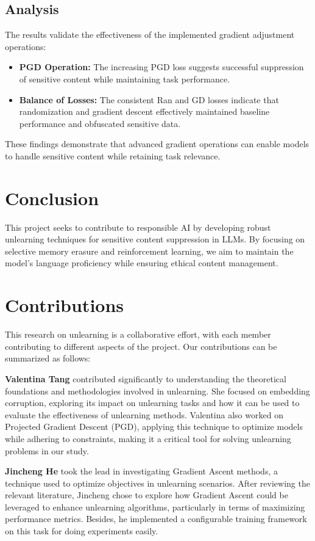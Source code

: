 \documentclass[11pt]{article}
\begin{document}
    \subsection{Analysis}
    The results validate the effectiveness of the implemented gradient adjustment operations:
    \begin{itemize}
        \item \textbf{PGD Operation:} The increasing PGD loss suggests successful suppression of sensitive content while maintaining task performance.
        \item \textbf{Balance of Losses:} The consistent Ran and GD losses indicate that randomization and gradient descent effectively maintained baseline performance and obfuscated sensitive data.
    \end{itemize}
    These findings demonstrate that advanced gradient operations can enable models to handle sensitive content while retaining task relevance.


    \section{Conclusion}
    This project seeks to contribute to responsible AI by developing robust unlearning techniques for sensitive content suppression in LLMs. By focusing on selective memory erasure and reinforcement learning, we aim to maintain the model's language proficiency while ensuring ethical content management.


    \section{Contributions}

    This research on unlearning is a collaborative effort, with each member contributing to different aspects of the project. Our contributions can be summarized as follows:

    \textbf{Valentina Tang} contributed significantly to understanding the theoretical foundations and methodologies involved in unlearning. She focused on embedding corruption, exploring its impact on unlearning tasks and how it can be used to evaluate the effectiveness of unlearning methods. Valentina also worked on Projected Gradient Descent (PGD), applying this technique to optimize models while adhering to constraints, making it a critical tool for solving unlearning problems in our study.

    \textbf{Jincheng He} took the lead in investigating Gradient Ascent methods, a technique used to optimize objectives in unlearning scenarios. After reviewing the relevant literature, Jincheng chose to explore how Gradient Ascent could be leveraged to enhance unlearning algorithms, particularly in terms of maximizing performance metrics. Besides, he implemented a configurable training framework on this task for doing experiments easily.
\end{document}
